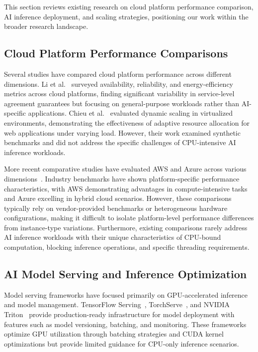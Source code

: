 This section reviews existing research on cloud platform performance comparison, AI inference deployment, and scaling strategies, positioning our work within the broader research landscape.

\subsection{Cloud Platform Performance Comparisons}

Several studies have compared cloud platform performance across different dimensions. Li et al.~\cite{li2013survey} surveyed availability, reliability, and energy-efficiency metrics across cloud platforms, finding significant variability in service-level agreement guarantees but focusing on general-purpose workloads rather than AI-specific applications. Chieu et al.~\cite{chieu2010dynamic} evaluated dynamic scaling in virtualized environments, demonstrating the effectiveness of adaptive resource allocation for web applications under varying load. However, their work examined synthetic benchmarks and did not address the specific challenges of CPU-intensive AI inference workloads.

More recent comparative studies have evaluated AWS and Azure across various dimensions~\cite{aws2023ha, azure2023ha}. Industry benchmarks have shown platform-specific performance characteristics, with AWS demonstrating advantages in compute-intensive tasks and Azure excelling in hybrid cloud scenarios. However, these comparisons typically rely on vendor-provided benchmarks or heterogeneous hardware configurations, making it difficult to isolate platform-level performance differences from instance-type variations. Furthermore, existing comparisons rarely address AI inference workloads with their unique characteristics of CPU-bound computation, blocking inference operations, and specific threading requirements.

\subsection{AI Model Serving and Inference Optimization}

Model serving frameworks have focused primarily on GPU-accelerated inference and model management. TensorFlow Serving~\cite{baylor2017tfserving}, TorchServe~\cite{pytorch2023serve}, and NVIDIA Triton~\cite{nvidia2023triton} provide production-ready infrastructure for model deployment with features such as model versioning, batching, and monitoring. These frameworks optimize GPU utilization through batching strategies and CUDA kernel optimizations but provide limited guidance for CPU-only inference scenarios.

